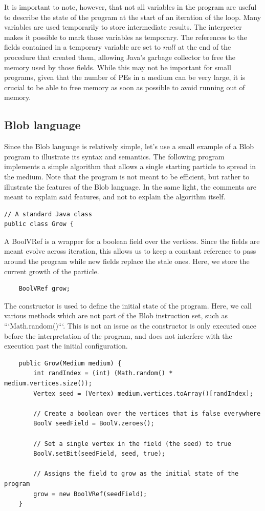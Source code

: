 \documentclass[11pt,a4paper]{report}
\begin{document}
It is important to note, however, that not all variables in the program are useful to describe the state of the program at the start of an iteration of the loop. Many variables are used temporarily to store intermediate results. The interpreter makes it possible to mark those variables as temporary. The references to the fields contained in a temporary variable are set to $null$ at the end of the procedure that created them, allowing Java's garbage collector to free the memory used by those fields. While this may not be important for small programs, given that the number of PEs in a medium can be very large, it is crucial to be able to free memory as soon as possible to avoid running out of memory.

\subsection{Blob language}

Since the Blob language is relatively simple, let's use a small example of a Blob program to illustrate its syntax and semantics. The following program implements a simple algorithm that allows a single starting particle to spread in the medium. Note that the program is not meant to be efficient, but rather to illustrate the features of the Blob language. In the same light, the comments are meant to explain said features, and not to explain the algorithm itself.

\begin{verbatim}
// A standard Java class
public class Grow {
\end{verbatim}

A BoolVRef is a wrapper for a boolean field over the vertices. Since the fields are meant evolve across iteration, this allows us to keep a constant reference to pass around the program while new fields replace the stale ones. Here, we store the current growth of the particle.
\begin{verbatim}
    BoolVRef grow;
\end{verbatim}

The constructor is used to define the initial state of the program.
Here, we call various methods which are not part of the Blob instruction set, 
such as ```Math.random()```.
This is not an issue as the constructor is only executed once before the
interpretation of the program, and does not interfere with the execution past 
the initial configuration.
\begin{verbatim}
    public Grow(Medium medium) {
        int randIndex = (int) (Math.random() * medium.vertices.size());
        Vertex seed = (Vertex) medium.vertices.toArray()[randIndex];
        
        // Create a boolean over the vertices that is false everywhere
        BoolV seedField = BoolV.zeroes();
        
        // Set a single vertex in the field (the seed) to true
        BoolV.setBit(seedField, seed, true);
        
        // Assigns the field to grow as the initial state of the program
        grow = new BoolVRef(seedField);         
    }
\end{verbatim}
\end{document}
